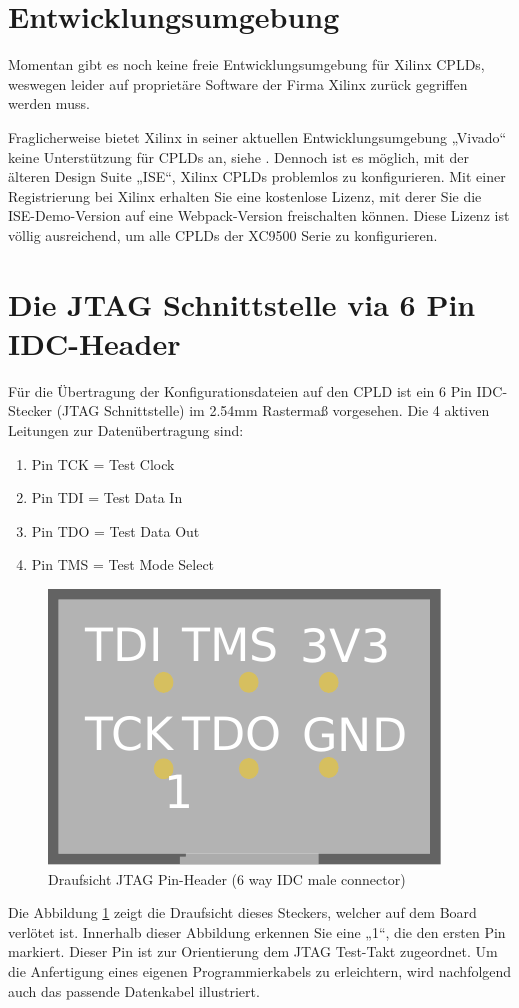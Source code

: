 \documentclass{article}
\begin{document}
\section{Entwicklungsumgebung}

Momentan gibt es noch keine freie \autocite{FSF} Entwicklungsumgebung für Xilinx CPLDs, weswegen leider auf proprietäre Software der Firma Xilinx zurück gegriffen werden muss.
 
Fraglicherweise bietet Xilinx in seiner aktuellen Entwicklungsumgebung „Vivado“ keine Unterstützung für CPLDs an, siehe \autocite[17]{Vivado}. Dennoch ist es möglich, mit der älteren Design Suite „ISE“, Xilinx CPLDs problemlos zu konfigurieren.
Mit einer Registrierung bei Xilinx erhalten Sie eine kostenlose Lizenz, mit derer Sie die ISE-Demo-Version auf eine Webpack-Version \autocite{ISE-Web} freischalten können. Diese Lizenz ist völlig ausreichend, um alle CPLDs der XC9500 Serie zu konfigurieren.

\section{Die JTAG Schnittstelle via 6 Pin IDC-Header}

Für die Übertragung der Konfigurationsdateien auf den CPLD ist ein 6 Pin IDC-Stecker (JTAG Schnittstelle) im 2.54mm Rastermaß vorgesehen. Die 4 aktiven Leitungen zur Datenübertragung sind:

\begin{enumerate}
	\item Pin TCK = Test Clock
	\item Pin TDI = Test Data In
	\item Pin TDO = Test Data Out
	\item Pin TMS = Test Mode Select
\end{enumerate}

\begin{figure}[!h]
	\centering
	\includegraphics[width=0.25\linewidth]{Figures/PinHeader6P_male}
	\caption{Draufsicht JTAG Pin-Header (6 way IDC male connector)}
	\label{fig:pinheader}
\end{figure}

\newpage

Die Abbildung \ref{fig:pinheader} zeigt die Draufsicht dieses Steckers, welcher auf dem Board verlötet ist.
Innerhalb dieser Abbildung erkennen Sie eine „1“, die den ersten Pin markiert. Dieser Pin ist zur Orientierung dem JTAG Test-Takt zugeordnet. Um die Anfertigung eines eigenen Programmierkabels zu erleichtern, wird nachfolgend auch das passende Datenkabel illustriert.
\end{document}
